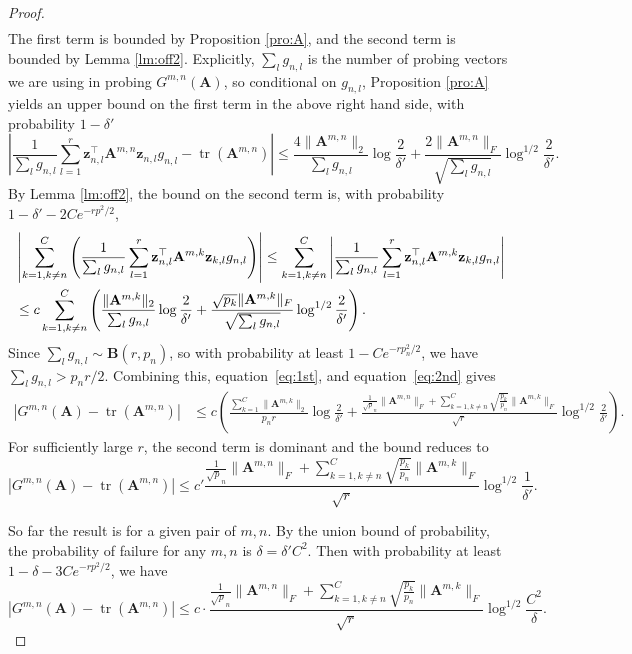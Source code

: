 \documentclass[10pt]{article}
\def\eqref#1{equation~\ref{#1}}
\newcommand{\B}{\mathbf}
\begin{document}
\begin{proof}
\begin{align*}
\end{align*}
The first term is bounded by Proposition \ref{pro:A}, and the second term is bounded by Lemma \ref{lm:off2}. Explicitly, $\sum_l g_{n,l}$ is the number of probing vectors we are using in probing $G^{m, n}(\B{A})$, so conditional on $g_{n,l}$, Proposition \ref{pro:A} yields an upper bound on the first term in the above right hand side, with probability $1-\delta'$
\begin{equation}\label{eq:1st}
\left| \frac{1}{\sum_l g_{n,l}} \sum_{l=1}^r \B{z}_{n,l}^{\top} \B{A}^{m,n} \B{z}_{n,l}g_{n,l} - \operatorname{tr}(\B{A}^{m,n})\right| \leq \frac{4\|\B{A}^{m,n}\|_2}{\sum_l g_{n,l}}\log \frac{2}{\delta'} + \frac{2\|\B{A}^{m,n}\|_F}{\sqrt {\sum_l g_{n,l}}}\log^{1/2} \frac{2}{\delta'}.
\end{equation}
By Lemma \ref{lm:off2}, the bound on the second term is, with probability $1-\delta'-2Ce^{-rp^2/2}$,
\begin{align}\label{eq:2nd}
& \left|\sum_{k=1, k\neq n}^C \left( \frac{1}{\sum_l g_{n,l}}  \sum_{l=1}^r \B{z}_{n,l}^{\top} \B{A}^{m,k} \B{z}_{k,l}g_{n,l} \right) \right|  \leq \sum_{k=1, k\neq n}^C\left| \frac{1}{\sum_l g_{n,l}}  \sum_{l=1}^r \B{z}_{n,l}^{\top} \B{A}^{m,k} \B{z}_{k,l} g_{n,l}\right| \notag \\
& \leq c\sum_{k=1, k\neq n}^C \left( \frac{\|\B{A}^{m,k}\|_2}{\sum_l g_{n,l}} \log \frac{2}{\delta'} + \frac{\sqrt{p_k}\|\B{A}^{m,k}\|_F}{\sqrt {\sum_l g_{n,l}}} \log^{1/2} \frac{2}{\delta'} \right).
\end{align}
Since $\sum_l g_{n,l}\sim \B{B}(r,p_n)$, so with probability at least $1-Ce^{-r p_n^2/2}$, we have $\sum_l g_{n,l}>p_n r/2$. Combining this, \eqref{eq:1st}, and \eqref{eq:2nd} gives
\begin{align*}
|G^{m, n}(\B{A})-\operatorname{tr}(\B{A}^{m,n})| & \leq c \left(\frac{\sum\limits_{k=1}^C \|\B{A}^{m,k}\|_2}{p_n r}\log\frac{2}{\delta'} + \frac{\frac{1}{\sqrt p_n}\|\B{A}^{m,n}\|_F +\sum\limits_{k=1,k\neq n}^C\sqrt{\frac{p_k}{p_n}} \|\B{A}^{m,k}\|_F}{\sqrt {r}} \log^{1/2}\frac{2}{\delta'} \right).
\end{align*}
For sufficiently large $r$, the second term is dominant and the bound reduces to
\[
|G^{m, n}(\B{A})-\operatorname{tr}(\B{A}^{m,n})| \leq c'  \frac{\frac{1}{\sqrt p_n}\|\B{A}^{m,n}\|_F +\sum_{k=1, k\neq n}^C \sqrt{\frac{p_k}{p_n}}\|\B{A}^{m,k}\|_F}{\sqrt {r}} \log^{1/2} \frac{1}{\delta'} .
\]

So far the result is for a given pair of $m,n$. By the union bound of probability, the probability of failure for any $m,n$ is $\delta = \delta' C^2$. Then with probability at least $1-\delta- 3Ce^{-rp^2/2}$, we have
\[ |G^{m, n}(\B{A})-\operatorname{tr}(\B{A}^{m,n})| \leq c \cdot  \frac{\frac{1}{\sqrt p_n}\|\B{A}^{m,n}\|_F +\sum_{k=1, k\neq n}^C \sqrt{\frac{p_k}{p_n}}\|\B{A}^{m,k}\|_F}{\sqrt {r}} \log^{1/2} \frac{C^2}{\delta}. \]

\end{proof}
\end{document}
